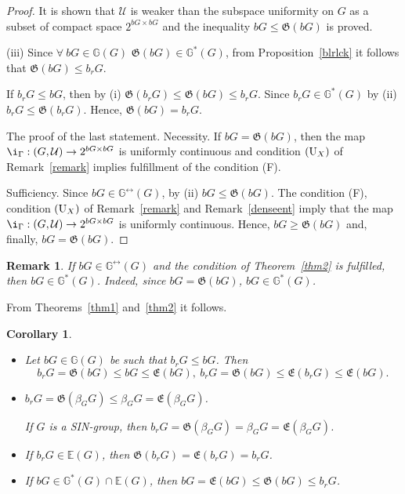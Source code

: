 \documentclass{amsart}
\newtheorem{cor}[thm]{Corollary}
\newtheorem{rem}[thm]{Remark}
\begin{document}
\begin{proof}
It is shown that $\mathcal U$ is weaker than the subspace uniformity on $G$ as a subset of compact space $2^{b G\times b G}$ and the inequality $b G\leq \mathfrak{G}(b G)$ is proved. 

\medskip

(iii) Since  $\forall\ b G\in \mathbb{G} (G)$  $\mathfrak{G}(bG)\in\mathbb{G}^*(G)$, from Proposition~\ref{blrlck} it follows that $\mathfrak{G}(b G)\leq b_r G$. 

If $b_r G\leq b G$, then by (i) $\mathfrak{G}(b_r G)\leq\mathfrak{G}(b G)\leq b_r G$. Since $b_r G\in\mathbb{G}^*(G)$ by (ii) $b_r G\leq\mathfrak{G}(b_r G)$. Hence, $\mathfrak{G}(b G)=b_r G$. 

\medskip

The proof of the last statement. Necessity. If $b G=\mathfrak{G}(b G)$, then the map $\i_{\Gamma}: (G, \mathcal U)\to 2^{b G\times b G}$ is uniformly continuous and condition $({\rm U}_X)$ of Remark~\ref{remark} implies fulfillment of the condition (F). 

Sufficiency. Since $b G\in\mathbb{G}^{\leftrightarrow}(G)$, by (ii) $b G\leq\mathfrak{G}(b G)$. The condition (F), condition $({\rm U}_X)$ of Remark~\ref{remark} and Remark~\ref{denseent} imply that the map $\i_{\Gamma}: (G, \mathcal U)\to 2^{b G\times b G}$ is uniformly continuous. Hence,  $b G\geq\mathfrak{G}(b G)$ and, finally, $b G=\mathfrak{G}(b G)$.
\end{proof}

\begin{rem}
{\rm If $b G\in\mathbb{G}^{\leftrightarrow}(G)$ and the condition of Theorem~\ref{thm2} is fulfilled, then $b G\in\mathbb{G}^*(G)$. Indeed, since $b G=\mathfrak{G}(b G)$, $b G\in\mathbb{G}^*(G)$.}
\end{rem}


From Theorems~\ref{thm1} and~\ref{thm2} it follows.

\begin{cor}\label{propBcomp}
\begin{itemize}
\item[(a)] Let $b G\in\mathbb{G}(G)$ be such that $b_r G\leq b G$. Then
$$b_r G=\mathfrak{G}(b G)\leq b G\leq\mathfrak{E}(b G),\ b_r G=\mathfrak{G}(b G)\leq\mathfrak{E}(b_r G)\leq\mathfrak{E}(b G).$$

\item[(b)]  $b_r G=\mathfrak{G}(\beta_G G)\leq\beta_G G=\mathfrak{E}(\beta_G G)$. 

If $G$ is a {\rm SIN}-group, then $b_r G=\mathfrak{G}(\beta_G G)=\beta_G G=\mathfrak{E}(\beta_G G)$. 

\item[(c)] If $b_r G\in\mathbb E (G)$, then $\mathfrak{G}(b_r G)=\mathfrak{E}(b_r G)=b_r G$.

\item[(d)] If $b G\in\mathbb{G}^*(G)\cap\mathbb{E}(G)$, then $b G=\mathfrak{E}(b G)\leq\mathfrak{G}(b G)\leq b_r G$.
\end{itemize}
\end{cor}
\end{document}
